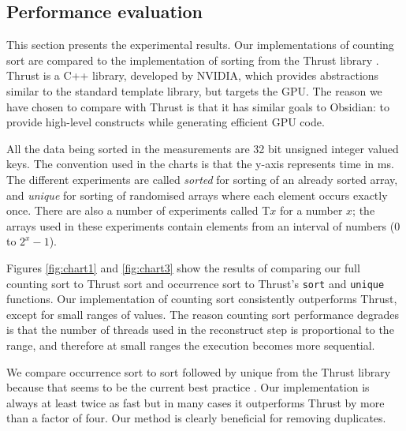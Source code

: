 
\subsection{Performance evaluation} 
\label{sec:Benchmarks}

\FloatBarrier

This section presents the experimental results. Our implementations of
counting sort are compared to the implementation of sorting from the
Thrust library \cite{THRUST}. Thrust is a C++ library, developed by
NVIDIA, which provides abstractions similar to the standard template
library, but targets the GPU. The reason we have chosen to compare with
Thrust is that it has similar goals to Obsidian: to provide high-level 
constructs while generating efficient GPU code.

All the data being sorted in the measurements are 32 bit unsigned
integer valued keys.
The convention used in the charts is that the y-axis represents time in ms. 
The different experiments are called {\em sorted} for sorting of an 
already sorted array, and {\em unique} for sorting of randomised arrays where each 
element occurs exactly once. There are also a number of experiments called 
T$x$ for a number $x$;  the arrays used in these experiments contain
elements from an interval of numbers (0 to $2^x-1$). 

Figures \ref{fig:chart1} and \ref{fig:chart3} show the results of
comparing our full counting sort to Thrust sort and occurrence sort
 to Thrust's {\tt sort} and {\tt unique} functions.
Our implementation of
counting sort consistently outperforms Thrust, except for small ranges
of values. The reason counting sort performance degrades is that the
number of threads used in the reconstruct step is proportional to the
range, and therefore at small ranges the execution becomes more
sequential.

We compare occurrence sort to sort followed by unique from
the Thrust library because that seems to be the current best practice
\cite{REMOVEDUPS}. Our implementation is always at least twice as fast
but in many cases it outperforms Thrust by more than a factor of four.
Our method is clearly beneficial for removing duplicates.


